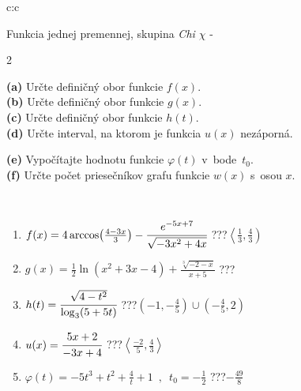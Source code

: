 \documentclass[10pt]{report}
\begin{document}
\begin{tabular}{c:c}
\begin{minipage}[c][104.5mm][t]{0.5\linewidth}
\begin{center}
\vspace{7mm}
{\huge Funkcia jednej premennej, skupina \textit{Chi $\chi$} -}\\[5mm]
\begin{minipage}{0.95\linewidth}
\begin{center}
{\small \begin{multicols}{2} \raggedright
\textbf{(a)} Určte definičný obor funkcie \(f(x)\). \\[1mm]
\textbf{(b)} Určte definičný obor funkcie \(g(x)\). \\[1mm]
\textbf{(c)} Určte definičný obor funkcie \(h(t)\). \\[1mm]
\textbf{(d)} Určte interval, na ktorom je funkcia \(u(x)\) nezáporná. \par \columnbreak
\textbf{(e)} Vypočítajte hodnotu funkcie \(\varphi(t)\) v~bode~\(t_0\). \\[1mm]
\textbf{(f)} Určte počet priesečníkov grafu funkcie \(w(x)\) s~osou \(x\). \\[1mm]
\end{multicols}
}
\end{center}
\end{minipage}
\\[4mm]
\begin{minipage}{0.79\linewidth}
\begin{center}
\begin{varwidth}{\linewidth}
\begin{enumerate}
\small
\item $f(x) = 4\arccos\!\left( \frac{4-3x}{3} \right) - \cfrac{e^{-5x+7}}{\sqrt{-3x^2+4x}}$\quad \dotfill\; ???\;\dotfill \quad $\left\langle\frac{1}{3} , \frac{4}{3}\right)$
\item $g(x) = \frac{1}{2} \ln{\!(x^2+3x-4)}+\frac{\sqrt[3]{-2-x}}{x+5}$\quad \dotfill\; ???\;\dotfill {}
\item $h(t) = \cfrac{\sqrt{4-t^2}}{\log_3(5+5t)}$\quad \dotfill\; ???\;\dotfill \quad $\left(-1 , -\frac{4}{5}\right)\cup\left(-\frac{4}{5} , 2\right)$
\item $u(x) = \cfrac{5x+2}{-3x+4}$\quad \dotfill\; ???\;\dotfill \quad $\left\langle\frac{-2}{5} , \frac{4}{3}\right\rangle$
\item $\varphi(t) = -5t^3+t^2+\frac{4}{t}+1 \enspace , \enspace t_0=-\frac{1}{2}$\quad \dotfill\; ???\;\dotfill \quad $-\frac{49}{8}$

\end{enumerate}
\end{varwidth}
\end{center}
\end{minipage}
\end{center}
\end{minipage}
\end{tabular}
\end{document}
